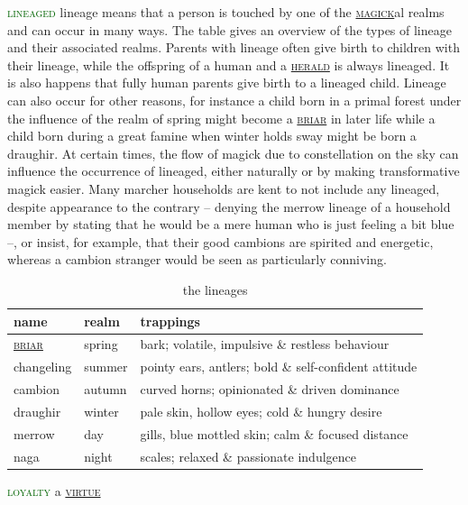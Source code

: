 \documentclass[twoside,11pt,b5paper,twocolumn]{scrbook}
\newcommand{\estcab}[1]{\textsc{\textcolor{marron}{#1}}}
\renewcommand{\paragraph}[1]{\par\noindent\markboth{#1}{#1}\estcab{\textcolor{darkgreen}{#1}}\label{#1} }
\newcommand{\see}[1]{{\estcab{\hyperref[#1]{#1}}}}
\begin{document}
\paragraph{lineaged} lineage means that a person is touched by one of the \see{magick}al realms and can occur in many ways. The table gives an overview of the types of lineage and their associated realms. Parents with lineage often give birth to children with their lineage, while the offspring of a human and a \see{herald} is always lineaged. It is also happens that fully human parents give birth to a lineaged child. Lineage can also occur for other reasons, for instance a child born in a primal forest under the influence of the realm of spring might become a \see{briar} in later life while a child born during a great famine when winter holds sway might be born a draughir. At certain times, the flow of magick due to constellation on the sky can influence the occurrence of lineaged, either naturally or by making transformative magick easier. Many marcher households are kent to not include any lineaged, despite appearance to the contrary – denying the merrow lineage of a household member by stating that he would be a mere human who is just feeling a bit blue –, or insist, for example, that their good cambions are spirited and energetic, whereas a cambion stranger would be seen as particularly conniving.\begin{table}\begin{tabular}{lll} name& realm& trappings\\ \hline \see{briar}& spring& bark; volatile, impulsive \& restless behaviour\\ changeling& summer& pointy ears, antlers; bold \& self-confident attitude\\ cambion& autumn& curved horns; opinionated \& driven dominance\\ draughir& winter& pale skin, hollow eyes; cold \& hungry desire\\ merrow& day& gills, blue mottled skin; calm \& focused distance\\ naga& night& scales; relaxed \& passionate indulgence\end{tabular}\caption{the lineages}\end{table}
\paragraph{loyalty} a \see{virtue}
\end{document}
